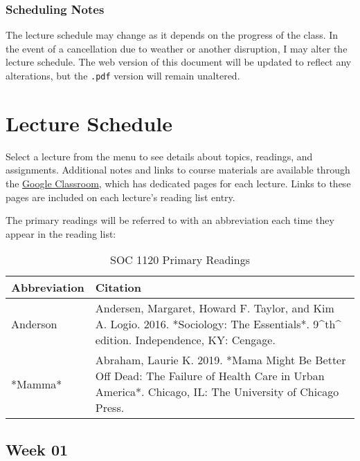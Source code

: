 \documentclass[]{book}
\begin{document}
\hypertarget{scheduling-notes}{%
\subsection{Scheduling Notes}\label{scheduling-notes}}

The lecture schedule may change as it depends on the progress of the class. In the event of a cancellation due to weather or another disruption, I may alter the lecture schedule. The web version of this document will be updated to reflect any alterations, but the \texttt{.pdf} version will remain unaltered.

\hypertarget{lecture-schedule}{%
\chapter{Lecture Schedule}\label{lecture-schedule}}

Select a lecture from the menu to see details about topics, readings, and assignments. Additional notes and links to course materials are available through the \href{https://classroom.google.com}{Google Classroom}, which has dedicated pages for each lecture. Links to these pages are included on each lecture's reading list entry.

The primary readings will be referred to with an abbreviation each time they appear in the reading list:

\begin{table}[t]

\caption{\label{tab:unnamed-chunk-1}SOC 1120 Primary Readings}
\centering
\begin{tabular}{ll}
\toprule
Abbreviation & Citation\\
\midrule
Anderson & Andersen, Margaret, Howard F. Taylor, and Kim A. Logio. 2016. *Sociology: The Essentials*. 9\textasciicircum{}th\textasciicircum{} edition. Independence, KY: Cengage.\\
*Mamma* & Abraham, Laurie K. 2019. *Mama Might Be Better Off Dead: The Failure of Health Care in Urban America*. Chicago, IL: The University of Chicago Press.\\
\bottomrule
\end{tabular}
\end{table}

\newpage

\hypertarget{week-01}{%
\section*{Week 01}\label{week-01}}
\end{document}

